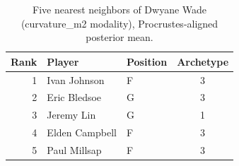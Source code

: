 \begin{table}[htbp]
  \centering\small
  \begin{tabular}{rllc}
    \toprule
    Rank & Player & Position & Archetype \\
    \midrule
    1 & Ivan Johnson & F & 3 \\
    2 & Eric Bledsoe & G & 3 \\
    3 & Jeremy Lin & G & 1 \\
    4 & Elden Campbell & F & 3 \\
    5 & Paul Millsap & F & 3 \\
    \bottomrule
  \end{tabular}
  \caption{Five nearest neighbors of Dwyane Wade (curvature_m2 modality), Procrustes-aligned posterior mean.}
  \label{tab:Dwyane_Wade_neighbors_curvature_m2}
\end{table}

